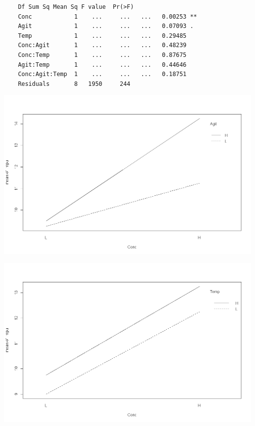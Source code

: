 \documentclass[a4paper,12pt]{article}
\begin{document}
\begin{framed}
	\begin{verbatim}
	Df Sum Sq Mean Sq F value  Pr(>F)
	Conc            1    ...     ...   ...   0.00253 **
	Agit            1    ...     ...   ...   0.07093 .
	Temp            1    ...     ...   ...   0.29485
	Conc:Agit       1    ...     ...   ...   0.48239
	Conc:Temp       1    ...     ...   ...   0.87675
	Agit:Temp       1    ...     ...   ...   0.44646
	Conc:Agit:Temp  1    ...     ...   ...   0.18751
	Residuals       8   1950     244
	\end{verbatim}
\end{framed}

\newpage
\begin{center}
	\includegraphics[scale=0.3]{images/ExamQ6interactiona}
\end{center}
\begin{center}
	\includegraphics[scale=0.3]{images/ExamQ6interactionb}
\end{center}
\end{document}
